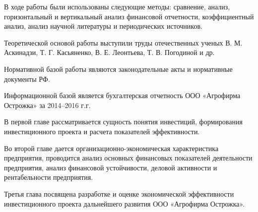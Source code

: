 В ходе работы были использованы следующие методы: сравнение, анализ, горизонтальный и вертикальный анализ финансовой отчетности, коэффициентный анализ, анализ научной литературы и периодических источников.

Теоретической основой работы выступили труды отечественных ученых В. М. Аскинадзи, Т. Г. Касьяненко, В. Е. Леонтьева, Т. В. Погодиной и др.

Нормативной базой работы являются законодательные акты и нормативные документы РФ.

Информационной базой является бухгалтерская отчетность ООО «Агрофирма Острожка» за 2014--2016 г.г.

В первой главе рассматривается сущность понятия инвестиций, формирования инвестиционного проекта и расчета показателей эффективности.

Во второй главе дается организационно-экономическая характеристика предприятия, проводится анализ основных финансовых показателей деятельности предприятия, анализ финансовой устойчивости, деловой активности и рентабельности предприятия.

Третья глава посвящена разработке и оценке экономической эффективности инвестиционного проекта дальнейшего развития ООО «Агрофирма Острожка».
